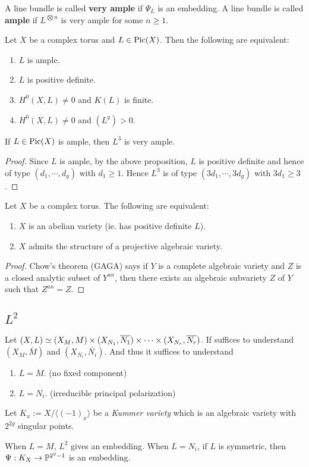 \begin{definition}
A line bundle is called \textbf{very ample} if $\Psi_L$ is an embedding. A line bundle is called \textbf{ample} if $L^{\bigotimes n}$ is very ample for some $n\geq 1$. 
\end{definition}

\begin{proposition}
Let $X$ be a complex torus and $L\in \operatorname{Pic}(X)$. Then the following are equivalent:
\begin{enumerate}
\item $L$ is ample.
\item $L$ is positive definite.
\item $H^0(X,L)\not=0$ and $K(L)$ is finite.
\item $H^0(X,L)\not=0$ and $(L^g)>0$.
\end{enumerate}
\end{proposition}

\begin{corollary}
If $L\in \operatorname{Pic}(X)$ is ample, then $L^3$ is very ample.
\end{corollary}
\begin{proof}
Since $L$ is ample, by the above proposition, $L$ is positive definite and hence of type $(d_1,\cdots, d_g)$ with $d_1\geq 1$. Hence $L^3$ is of type $(3d_1,\cdots, 3d_g)$ with $3d_1\geq 3$. 
\end{proof}

\begin{theorem}
Let $X$ be a complex torus. The following are equivalent:
\begin{enumerate}
\item $X$ is an abelian variety (ie. has positive definite $L$).
\item $X$ admits the structure of a projective algebraic variety.
\end{enumerate}
\end{theorem}

\begin{proof}
Chow's theorem (GAGA) says if $Y$ is a complete algebraic variety and $Z$ is a closed analytic subset of $Y^{an}$, then there exists an algebraic subvariety $Z$ of $Y$ such that $Z^{an}=Z$. 
\end{proof}


\subsection{$L^2$}
Let $(X,L)\simeq (X_M,M)\times (X_{N_1}, \overline{N_1})\times \cdots \times (X_{N_r},\overline{N_r})$. If suffices to understand $(X_M,\overline{M})$ and $(X_{N_i},\overline{N_i})$. And thus it suffices to understand 
\begin{enumerate}
\item $L=M$. (no fixed component)
\item $L=N_i$. (irreducible principal polarization)
\end{enumerate} 

Let $K_x:=X/\langle (-1)_x\rangle$ be a \emph{Kummer variety} which is an algebraic variety with $2^{2g}$ singular points.

\begin{theorem}
When $L=M$, $L^2$ gives an embedding. When $L=N_i$, if $L$ is symmetric, then $\Psi:K_X\to {\mathbb P}^{2^g-1}$ is an embedding. 
\end{theorem}